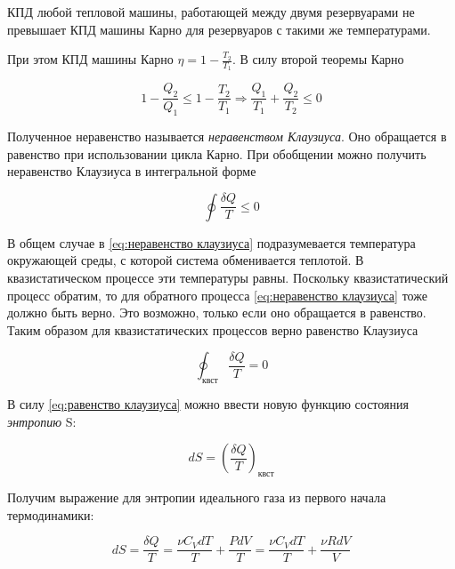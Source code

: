 \begin{theorem} 
    КПД любой тепловой машины, работающей между двумя резервуарами не превышает КПД машины Карно для резервуаров с такими же температурами.
\end{theorem}

\noindent
При этом КПД машины Карно $\eta = 1 - \frac{T_2}{T_1}$. В силу второй теоремы Карно

\begin{equation}
    1 - \frac{Q_2}{Q_1} \leq 1 - \frac{T_2}{T_1} \Rightarrow \frac{Q_1}{T_1} + \frac{Q_2}{T_2} \leq 0
\end{equation}

Полученное неравенство называется \textit{неравенством Клаузиуса}. Оно обращается в равенство при использовании цикла Карно. При обобщении можно получить неравенство Клаузиуса в интегральной форме

\begin{equation} \label{eq:неравенство клаузиуса}
    \oint \frac{\delta Q}{T} \leq 0
\end{equation}

\noindent
В общем случае в \eqref{eq:неравенство клаузиуса} подразумевается температура окружающей среды, с которой система обменивается теплотой. В квазистатическом процессе эти температуры равны. Поскольку квазистатический процесс обратим, то для обратного процесса \eqref{eq:неравенство клаузиуса} тоже должно быть верно. Это возможно, только если оно обращается в равенство. Таким образом для квазистатических процессов верно равенство Клаузиуса

\begin{equation} \label{eq:равенство клаузиуса}
    \oint_\text{квст} \frac{\delta Q}{T} = 0
\end{equation}

\noindent
В силу \eqref{eq:равенство клаузиуса} можно ввести новую функцию состояния \textit{энтропию} S:

\begin{equation}
    dS = \left( \frac{\delta Q}{T} \right)_\text{квст}
\end{equation}

\noindent
Получим выражение для энтропии идеального газа из первого начала термодинамики:

\begin{equation*}
    dS = \frac{\delta Q}{T} = \frac{\nu C_V dT}{T} + \frac{P dV}{T} = \frac{\nu C_V dT}{T} + \frac{\nu R dV}{V}
\end{equation*}

